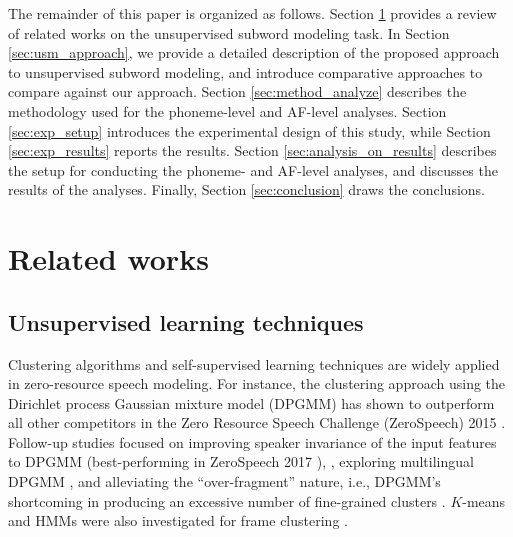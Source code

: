 \documentclass[transmag]{IEEEtran}
\begin{document}
The remainder of this paper is organized as follows. Section \ref{sec:related_works} provides a review of related works on the unsupervised subword modeling task. In Section \ref{sec:usm_approach}, we provide a detailed description of the proposed approach to unsupervised subword modeling, and introduce comparative approaches to compare against our approach. Section \ref{sec:method_analyze} describes the methodology  used for the phoneme-level and AF-level analyses. Section  \ref{sec:exp_setup} introduces the experimental design of this study, while Section \ref{sec:exp_results} reports the results. Section \ref{sec:analysis_on_results} describes the setup for conducting the phoneme- and AF-level analyses, and discusses the results of the analyses. Finally, Section \ref{sec:conclusion} draws the conclusions.

\section{Related works}
\label{sec:related_works}
\subsection{Unsupervised learning techniques}
Clustering algorithms and self-supervised learning techniques are widely applied in zero-resource speech modeling. 
For instance, the clustering approach using the Dirichlet process Gaussian mixture model (DPGMM) \cite{chang2013parallel} has shown to outperform all other competitors \cite{chen2015parallel} in the Zero Resource Speech Challenge (ZeroSpeech) 2015 \cite{versteegh2015zero}. 
Follow-up studies focused on improving speaker invariance of the input features to DPGMM  \cite{heck2017feature} (best-performing in ZeroSpeech 2017 \cite{dunbar2017zero}), \cite{feng2018exploiting,Higuchi2019}, exploring multilingual DPGMM \cite{chen2017multilingual,yuan2017extracting}, and alleviating the “over-fragment” nature, i.e., DPGMM’s shortcoming in producing an excessive number of fine-grained clusters  \cite{wu2018optimizing,feng2019_TASLP}. 
$K$-means and HMMs were also investigated for frame clustering   \cite{ansari2017unsupervised,manenti2017unsupervised}.
\end{document}
